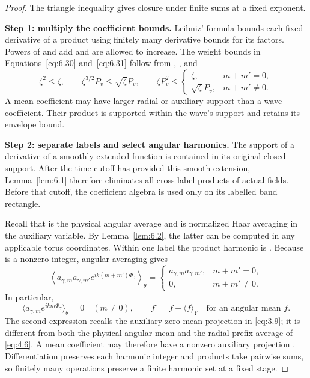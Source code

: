 \begin{proof}
The triangle inequality gives closure under finite sums at a fixed exponent.

\textbf{Step 1: multiply the coefficient bounds.} Leibniz' formula bounds each
fixed derivative of a product using finitely many derivative bounds for its
factors. Powers of  and
 add
%
and are allowed to increase. The weight bounds in Equations~\eqref{eq:6.30}
and~\eqref{eq:6.31} follow from ,
, and
\[
  \zeta^2\le\zeta,
  \qquad \zeta^{3/2}P_v\le\sqrt\zeta P_v,
  \qquad
  \zeta P_v^2\le
  \begin{cases}
    \zeta,&m+m'=0,\\
    \sqrt\zeta P_v,&m+m'\ne0.
  \end{cases}
\]
A mean coefficient may have larger radial or auxiliary support than a wave
coefficient. Their product is supported within the wave's support and retains
its envelope bound.

\textbf{Step 2: separate labels and select angular harmonics.} The support of
a derivative of a smoothly extended function is contained in its original
closed support. After the time cutoff has provided this smooth extension,
Lemma~\ref{lem:6.1} therefore eliminates all cross-label products of actual
fields. Before that cutoff, the coefficient algebra is used only on its
labelled band rectangle.

Recall that  is the physical
angular average and  is normalized
Haar averaging in the auxiliary variable. By Lemma~\ref{lem:6.2}, the latter
can be computed in any applicable torus coordinates. Within one label the
product harmonic is . Because
 is a nonzero integer, angular averaging gives
\[
  \left\langle
    a_{\gamma,m}a_{\gamma,m'}e^{ik(m+m')\Phi_\gamma}
  \right\rangle_\theta
  =
  \begin{cases}
    a_{\gamma,m}a_{\gamma,m'},&m+m'=0,\\
    0,&m+m'\ne0.
  \end{cases}
\]
In particular,
\[
  \langle a_{\gamma,m}e^{ikm\Phi_\gamma}\rangle_\theta=0
  \quad(m\ne0),
  \qquad
  f^\circ=f-\langle f\rangle_Y
  \quad\text{for an angular mean }f.
\]
The second expression recalls the auxiliary zero-mean projection in
\eqref{eq:3.9}; it is different from both the physical angular mean and the
radial prefix average  of
\eqref{eq:4.6}. A mean coefficient may therefore have a nonzero auxiliary
projection . Differentiation preserves each
harmonic integer and products take pairwise sums, so finitely many operations
preserve a finite harmonic set at a fixed stage.


\end{proof}
